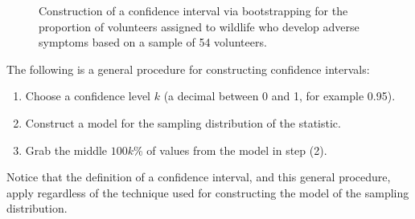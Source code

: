 \documentclass[
  letterpaper,
  DIV=11,
  numbers=noendperiod]{scrreprt}
\providecommand{\tightlist}{%
  \setlength{\itemsep}{0pt}\setlength{\parskip}{0pt}}\usepackage{longtable,booktabs,array}
\theoremstyle{plain}
\theoremstyle{definition}
\theoremstyle{definition}
\theoremstyle{remark}
\begin{document}
\begin{figure}


\caption{\label{fig-samplingdistns-deepwater-ci}Construction of a
confidence interval via bootstrapping for the proportion of volunteers
assigned to wildlife who develop adverse symptoms based on a sample of
54 volunteers.}

\end{figure}%

\begin{tcolorbox}[enhanced jigsaw, breakable, titlerule=0mm, colframe=quarto-callout-tip-color-frame, bottomtitle=1mm, opacityback=0, rightrule=.15mm, toptitle=1mm, arc=.35mm, bottomrule=.15mm, left=2mm, title=\textcolor{quarto-callout-tip-color}{\faLightbulb}\hspace{0.5em}{Process for Constructing a Confidence Interval}, leftrule=.75mm, coltitle=black, toprule=.15mm, colbacktitle=quarto-callout-tip-color!10!white, colback=white, opacitybacktitle=0.6]

The following is a general procedure for constructing confidence
intervals:

\begin{enumerate}
\def\labelenumi{\arabic{enumi}.}
\tightlist
\item
  Choose a confidence level \(k\) (a decimal between 0 and 1, for
  example 0.95).
\item
  Construct a model for the sampling distribution of the statistic.
\item
  Grab the middle \(100k\)\% of values from the model in step (2).
\end{enumerate}

Notice that the definition of a confidence interval, and this general
procedure, apply regardless of the technique used for constructing the
model of the sampling distribution.

\end{tcolorbox}
\end{document}

